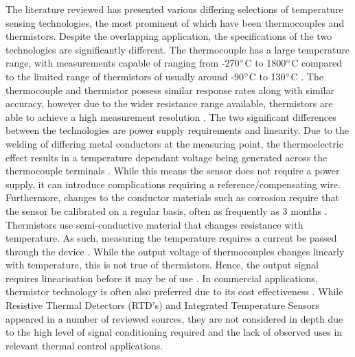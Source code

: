 The literature reviewed has presented various differing selections of temperature sensing technologies, the most prominent of which have been thermocouples and thermistors. Despite the overlapping application, the specifications of the two technologies are significantly different. The thermocouple has a large temperature range, with measurements capable of ranging from -270$\degree$C to 1800$\degree$C compared to the limited range of thermistors of usually around -90$\degree$C to 130$\degree$C \cite{11303490}\cite{15156909}\cite{10650397}. The thermocouple and thermistor possess similar response rates along with similar accuracy, however due to the wider resistance range available, thermistors are able to achieve a high measurement resolution \cite{11303490}\cite{15156909}\cite{10650397}. The two significant differences between the technologies are power supply requirements and linearity. Due to the welding of differing metal conductors at the measuring point, the thermoelectric effect results in a temperature dependant voltage being generated across the thermocouple terminals \cite{11303490}\cite{10650397}\cite{15156909}. While this means the sensor does not require a power supply, it can introduce complications requiring a reference/compensating wire. Furthermore, changes to the conductor materials such as corrosion require that the sensor be calibrated on a regular basis, often as frequently as 3 months \cite{11303490}\cite{15156909}\cite{10650397}. Thermistors use semi-conductive material that changes resistance with temperature. As such, measuring the temperature requires a current be passed through the device \cite{11303490}\cite{15156909}. While the output voltage of thermocouples changes linearly with temperature, this is not true of thermistors. Hence, the output signal requires linearisation before it may be of use \cite{15156909}. In commercial applications, thermistor technology is often also preferred due to its cost effectiveness \cite{10650397}. While Resistive Thermal Detectors (RTD's) and Integrated Temperature Sensors appeared in a number of reviewed sources, they are not considered in depth due to the high level of signal conditioning required \cite{10650397}\cite{11303490} and the lack of observed uses in relevant thermal control applications.\\

